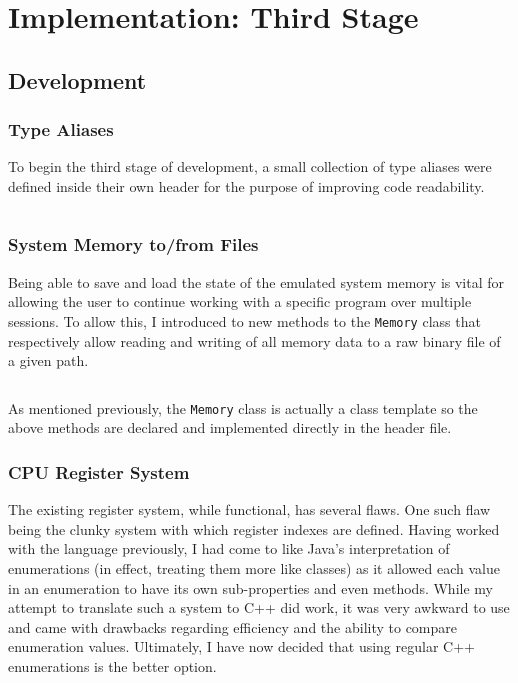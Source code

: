\newpage
\section{Implementation: Third Stage}

\subsection{Development}
    \subsubsection{Type Aliases} \label{sec:third-stage-aliases}
        To begin the third stage of development, a small collection of type aliases were defined inside their own header for the purpose of improving code readability.

        \inputminted{c++}{code/third/types.hpp}

    \subsubsection{System Memory to/from Files}
        Being able to save and load the state of the emulated system memory is vital for allowing the user to continue working with a specific program over multiple sessions. To allow this, I introduced to new methods to the \texttt{Memory} class that respectively allow reading and writing of all memory data to a raw binary file of a given path.

        \inputminted{c++}{code/third/memory.hpp}

        As mentioned previously, the \texttt{Memory} class is actually a class template so the above methods are declared and implemented directly in the header file.

    \subsubsection{CPU Register System}
        The existing register system, while functional, has several flaws. One such flaw being the clunky system with which register indexes are defined. Having worked with the language previously, I had come to like Java's interpretation of enumerations (in effect, treating them more like classes) as it allowed each value in an enumeration to have its own sub-properties and even methods. While my attempt to translate such a system to C++ did work, it was very awkward to use and came with drawbacks regarding efficiency and the ability to compare enumeration values. Ultimately, I have now decided that using regular C++ enumerations is the better option.

